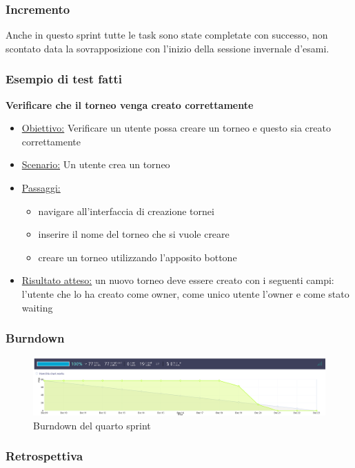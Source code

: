\documentclass{article}
\begin{document}
\subsubsection{Incremento}
Anche in questo sprint tutte le task sono state completate con successo, non scontato data la sovrapposizione con l'inizio della
sessione invernale d'esami. 

\subsubsection{Esempio di test fatti}

\textbf{Verificare che il torneo venga creato correttamente}
\begin{itemize}
    \item \underline{Obiettivo:} Verificare un utente possa creare un torneo e questo sia creato correttamente
    \item \underline{Scenario:} Un utente crea un torneo
    \item \underline{Passaggi:}
    \begin{itemize}
        \item navigare all'interfaccia di creazione tornei
        \item inserire il nome del torneo che si vuole creare
        \item creare un torneo utilizzando l'apposito bottone
    \end{itemize}
    \item \underline{Risultato atteso:} un nuovo torneo deve essere creato con i seguenti campi: l'utente che lo ha creato come owner, come unico utente l'owner 
    e come stato waiting
\end{itemize}

\subsubsection{Burndown}
\begin{figure}[H]
    \centering
    \includegraphics[width=1\textwidth]{burndown4}
    \caption{Burndown del quarto sprint}
    \label{fig:burndown4}
\end{figure}

\subsubsection{Retrospettiva}
\end{document}
